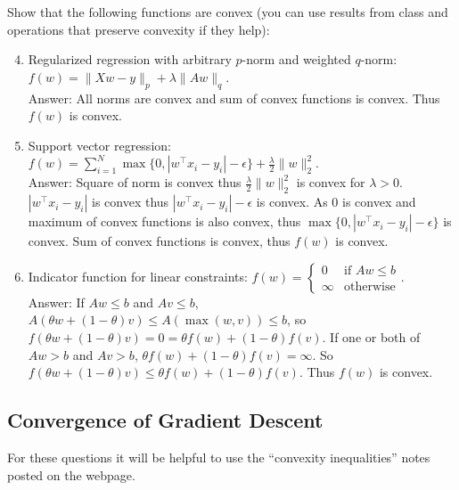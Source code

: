 \documentclass{article}
\def\blu#1{{\color{blu}#1}}
\def\gre#1{{\color{gre}#1}}
\def\norm#1{\|#1\|}
\def\enum#1{\begin{enumerate}#1\end{enumerate}}
\begin{document}
\blu{Show that the following functions are convex (you can use results from class and operations that preserve convexity if they help)}:
\enum{
\setcounter{enumi}{3}
\item Regularized regression with arbitrary $p$-norm and weighted $q$-norm: $f(w) = \norm{Xw - y}_p + \lambda\norm{Aw}_q$.
\gre{
\\ Answer: All norms are convex and sum of convex functions is convex. Thus $f(w)$ is convex.
}
\item Support vector regression: $f(w) = \sum_{i=1}^N\max\{0, |w^\top x_i - y_i| - \epsilon\} + \frac{\lambda}{2}\norm{w}_2^2$.
\gre{
\\Answer: Square of norm is convex thus $\frac{\lambda}{2}\norm{w}_2^2$ is convex for $\lambda>0$. $|w^\top x_i - y_i|$ is convex thus $|w^\top x_i - y_i| - \epsilon$ is convex. As 0 is convex and maximum of convex functions is also convex, thus $\max\{0, |w^\top x_i - y_i| - \epsilon\}$ is convex. Sum of convex functions is convex, thus $f(w)$ is convex.
}
\item Indicator function for linear constraints: $f(w) = \begin{cases}0 & \text{if $Aw \leq b$}\\\infty & \text{otherwise}\end{cases}$.
\gre{
\\ Answer: If $Aw \leq b$ and $Av \leq b$, $A(\theta w + (1-\theta) v) \leq A(\max(w, v)) \leq b$, so $f(\theta w + (1-\theta) v)=0=\theta f(w) + (1-\theta)f(v)$. If one or both of $Aw > b$ and $Av > b$, $\theta f(w) + (1-\theta)f(v) = \infty$. So $f(\theta w + (1-\theta) v) \leq \theta f(w) + (1-\theta)f(v)$. Thus $f(w)$ is convex.
}
}



\subsection{Convergence of Gradient Descent}

For these questions it will be helpful to use the ``convexity inequalities'' notes posted on the webpage.
\end{document}
